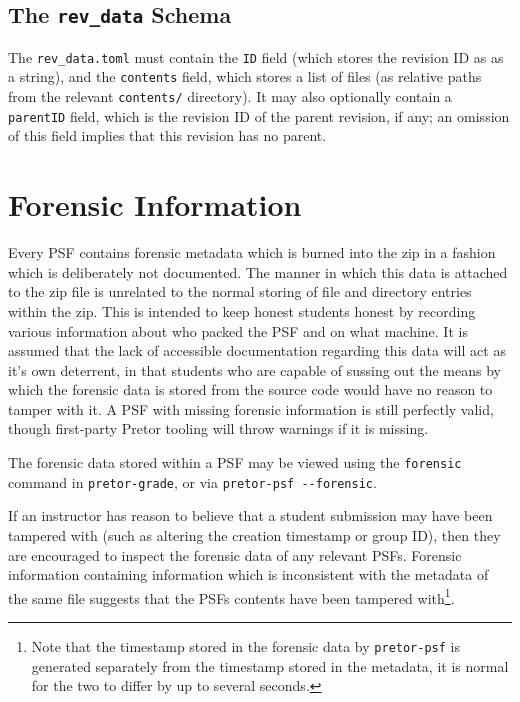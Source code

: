 \documentclass{book}
\begin{document}
\subsection{The \texttt{rev\_data} Schema} \label{sec:rev_data_schema}

The \texttt{rev\_data.toml} must contain the \texttt{ID} field (which stores
the revision ID as as a string), and the \texttt{contents} field, which stores
a list of files (as relative paths from the relevant \texttt{contents/}
directory). It may also optionally contain a \texttt{parentID} field, which is
the revision ID of the parent revision, if any; an omission of this field
implies that this revision has no parent.

\section{Forensic Information}


Every PSF contains forensic metadata which is burned into the zip in a fashion
which is deliberately not documented. The manner in which this data is attached
to the zip file is unrelated to the normal storing of file and directory
entries within the zip. This is intended to keep honest students honest by
recording various information about who packed the PSF and on what machine. It
is assumed that the lack of accessible documentation regarding this data will
act as it's own deterrent, in that students who are capable of sussing out the
means by which the forensic data is stored from the source code would have no
reason to tamper with it. A PSF with missing forensic information is still
perfectly valid, though first-party Pretor tooling will throw warnings if it is
missing.

The forensic data stored within a PSF may be viewed using the \texttt{forensic}
command in \texttt{pretor-grade}, or via \texttt{pretor-psf -{}-forensic}.

If an instructor has reason to believe that a student submission may have been
tampered with (such as altering the creation timestamp or group ID), then they
are encouraged to inspect the forensic data of any relevant PSFs. Forensic
information containing information which is inconsistent with the metadata of
the same file suggests that the PSFs contents have been tampered
with\footnote{Note that the timestamp stored in the forensic data by
\texttt{pretor-psf} is generated separately from the timestamp stored in the
metadata, it is normal for the two to differ by up to several seconds.}.
\end{document}
